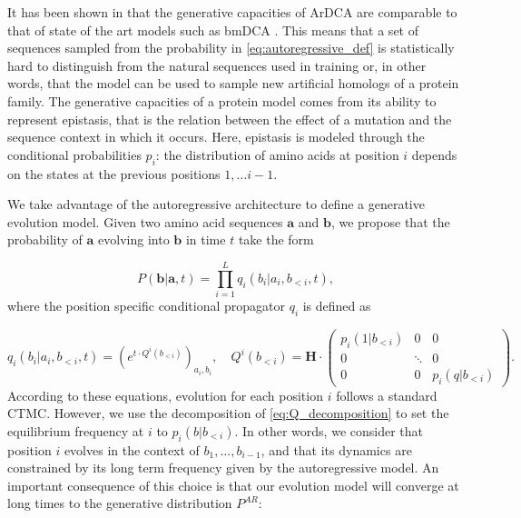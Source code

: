 It has been shown in \cite{trinquier_efficientgenerativemodeling_2021} that the generative capacities of ArDCA are comparable to that of state of the art models such as bmDCA \cite{mcgee_generativecapacityprobabilistic_2021}. 
This means that a set of sequences sampled from the probability in \eqref{eq:autoregressive_def} is statistically hard to distinguish from the natural sequences used in training or, in other words, that the model can be used to sample new artificial homologs of a protein family. 
The generative capacities of a protein model comes from its ability to represent epistasis, that is the relation between the effect of a mutation and the sequence context in which it occurs. 
Here, epistasis is modeled through the conditional probabilities $p_i$: the distribution of amino acids at position $i$ depends on the states at the previous positions $1, \ldots i-1$. 


We take advantage of the autoregressive architecture to define a generative evolution model. 
Given two amino acid sequences $\mathbf{a}$ and $\mathbf{b}$, we propose that the probability of $\mathbf{a}$ evolving into $\mathbf{b}$ in time $t$ take the form

\begin{equation}
	\label{eq:autoregressive_propagator_full}
	P(\mathbf{b} \vert \mathbf{a}, t) = \prod_{i=1}^L q_i(b_i \vert a_i, b_{<i}, t),
\end{equation}
where the position specific conditional propagator $q_i$ is defined as 

\begin{equation}
	\label{eq:autoregressive_site_propagator}
	q_i(b_i \vert a_i, b_{<i}, t) = \left(e^{t \cdot Q^i(b_{<i})}\right)_{a_i, b_i}, 
	\quad Q^i(b_{<i}) = \mathbf{H} \cdot \begin{pmatrix}
		p_i(1 \vert b_{<i}) & 0 & 0\\ 
		0 & \ddots & 0 \\
		0 & 0 & p_i(q \vert b_{<i})
	\end{pmatrix}. 
\end{equation}
According to these equations, evolution for each position $i$ follows a standard CTMC. 
However, we use the decomposition of \eqref{eq:Q_decomposition} to set the equilibrium frequency at $i$ to $p_i(b \vert b_{<i})$. 
In other words, we consider that position $i$ evolves in the context of $b_1, \ldots, b_{i-1}$, and that its dynamics are constrained by its long term frequency given by the autoregressive model. 
An important consequence of this choice is that our evolution model will converge at long times to the generative distribution $P^{AR}$: 

